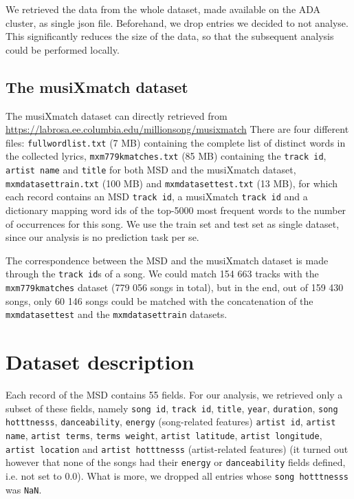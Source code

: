 \documentclass[11pt]{article}
\renewcommand\_{\textunderscore\allowbreak}
\begin{document}
We retrieved the data from the whole dataset, made available on the ADA cluster, as single json file. Beforehand, we drop entries we decided to not analyse. 
This significantly reduces the size of the data, so that the subsequent analysis could be performed locally.

\subsection{The musiXmatch dataset}
The musiXmatch dataset can directly retrieved from \url{https://labrosa.ee.columbia.edu/millionsong/musixmatch}
There are four different files: 
\texttt{full\_word\_list.txt} (7 MB) containing the complete list of distinct words in the collected lyrics, \texttt{mxm\_779k\_matches.txt} (85 MB) containing the \texttt{track id}, \texttt{artist name} and \texttt{title} for both MSD and the musiXmatch dataset, \texttt{mxm\_dataset\_train.txt} (100 MB) and \texttt{mxm\_dataset\_test.txt} (13 MB), for which each record contains an MSD \texttt{track id}, a musiXmatch \texttt{track id} and a dictionary mapping word ids of the top-5000 most frequent words to the number of occurrences for this song.
We use the train set and test set as single dataset, since our analysis is no prediction task per se.

The correspondence between the MSD and the musiXmatch dataset is made through the \texttt{track id}s of a song.
We could match 154 663 tracks with the \texttt{mxm\_779k\_matches} dataset (779 056 songs in total), but in the end, out of 159 430 songs, only 60 146 songs could be matched with the concatenation of the \texttt{mxm\_dataset\_test} and the \texttt{mxm\_dataset\_train} datasets.

\section{Dataset description}
Each record of the MSD contains 55 fields.
For our analysis, we retrieved only a subset of these fields, namely \texttt{song id}, \texttt{track id}, \texttt{title}, \texttt{year}, \texttt{duration}, \texttt{song hotttnesss}, \texttt{danceability}, \texttt{energy} (song-related features) \texttt{artist id}, \texttt{artist name}, \texttt{artist terms}, \texttt{terms weight}, \texttt{artist latitude},  \texttt{artist longitude}, \texttt{artist location} and \texttt{artist hotttnesss} (artist-related features) 
(it turned out however that none of the songs had their \texttt{energy} or \texttt{danceability} fields defined, i.e. not set to 0.0).
What is more, we dropped all entries whose \texttt{song hotttnesss} was \texttt{NaN}.
\end{document}
